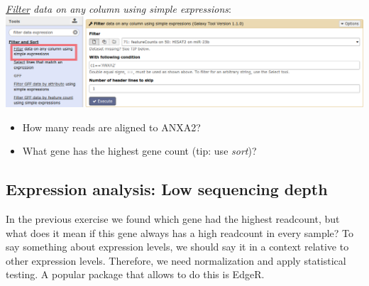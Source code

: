 \documentclass[11pt,a4paper]{article}
\begin{document}
\textit{\underline{Filter} data on any column using simple expressions}:\\
\includegraphics[width=\textwidth]{figures/expression_02.png}\\
\begin{itemize}
	\item How many reads are aligned to ANXA2?
	\item What gene has the highest gene count (tip: use \textit{sort})?
\end{itemize}

\subsection{Expression analysis: Low sequencing depth}
In the previous exercise we found which gene had the highest readcount, but what does it mean if this gene always has a high readcount in every sample? To say something about expression levels, we should say it in a context relative to other expression levels. Therefore, we need normalization and apply statistical testing. A popular package that allows to do this is EdgeR.
\end{document}
